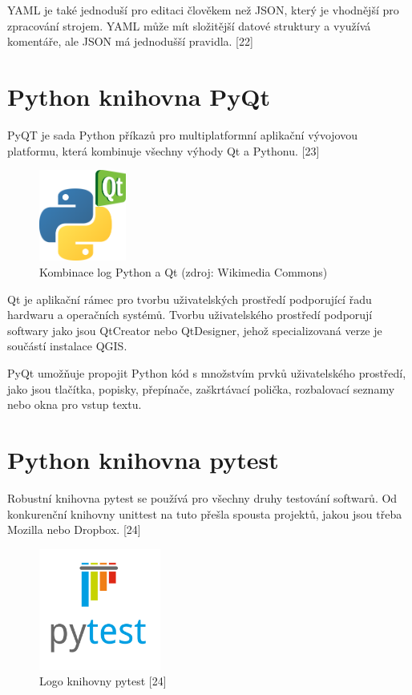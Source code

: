 \documentclass[a4paper,oneside,12pt]{book}
\begin{document}
YAML je také jednoduší pro editaci člověkem než JSON, který je vhodnější pro zpracování strojem. YAML může mít složitější datové struktury a využívá komentáře, ale JSON má jednodušší pravidla. [22]


\section{Python knihovna PyQt} \label{pyqt}
PyQT je sada Python příkazů pro multiplatformní aplikační vývojovou platformu, která kombinuje všechny výhody Qt a Pythonu.  [23]

\begin{figure}[ht] \label{obr8}
\centering
\includegraphics[height=3cm]{pictures/Python_and_Qt.png}
\caption{Kombinace log Python a Qt  (zdroj: Wikimedia Commons)}
\label{fig:qt}
\end{figure}

Qt je aplikační rámec pro tvorbu uživatelských prostředí podporující řadu hardwaru a operačních systémů. Tvorbu uživatelského prostředí podporují softwary jako jsou QtCreator nebo QtDesigner, jehož specializovaná verze je součástí instalace QGIS.

PyQt umožňuje propojit Python kód s množstvím prvků uživatelského prostředí, jako jsou tlačítka, popisky, přepínače, zaškrtávací polička, rozbalovací seznamy nebo okna pro vstup textu.

\section{Python knihovna pytest} \label{pytest}
Robustní knihovna pytest se používá pro všechny druhy testování softwarů. Od konkurenční knihovny unittest na tuto přešla spousta projektů, jakou jsou třeba Mozilla nebo Dropbox. [24]

\begin{figure}[ht] \label{obr9}
\centering
\includegraphics[height=4cm]{pictures/Pytest_logo.png}
\caption{Logo knihovny pytest [24]}
\label{fig:pytest}
\end{figure}
\end{document}
